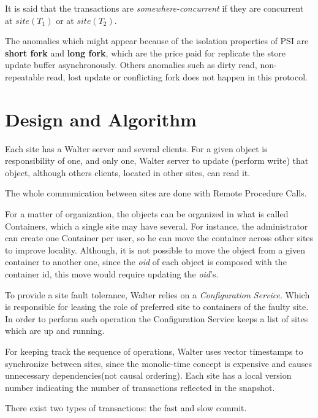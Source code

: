\documentclass[a4paper]{article}
\begin{document}
It is said that the transactions are \textit{somewhere-concurrent} if they are concurrent at $site(T_{1})$ or at $site(T_{2})$.

The anomalies which might appear because of the isolation properties of PSI are \textbf{short fork} and \textbf{long fork}, which are the price paid for replicate the store update buffer asynchronously. Others anomalies such as dirty read, non-repeatable read, lost update or conflicting fork does not happen in this protocol. 


\section{Design and Algorithm}

Each site has a Walter server and several clients. For a given object is responsibility of one, and only one, Walter server to update (perform write) that object, although others clients, located in other sites, can read it.

The whole communication between sites are done with Remote Procedure Calls. %

For a matter of organization, the objects can be organized in what is called Containers, which a single site may have several. For instance, the administrator can create one Container per user, so he can move the container across other sites to improve locality. Although, it is not possible to move the object from a given container to another one, since the \textit{oid} of each object is composed with the container id, this move would require updating the \textit{oid}'s. 

To provide a site fault tolerance, Walter relies on a \textit{Configuration Service}. Which is responsible for leasing the role of preferred site to containers of the faulty site. In order to perform such operation the Configuration Service keeps a list of sites which are up and running. 

For keeping track the sequence of operations, Walter uses vector timestamps to synchronize between sites, since the monolic-time concept is expensive and causes unnecessary dependencies(not causal ordering). Each site has a local version number indicating the number of transactions reflected in the snapshot.

There exist two types of transactions: the fast and slow commit. 
\end{document}
